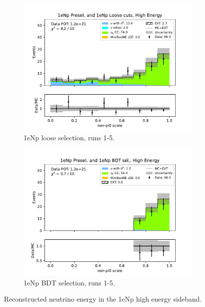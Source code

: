 \begin{figure}[H]
\begin{subfigure}{0.33\linewidth}
    \includegraphics[width=\linewidth]{technote/Sidebands/Figures/FarSideband/far_sideband_nonpi0_score_run1234a4b4c4d5_NP_NPL_HIGH_ENERGY.pdf}
    \caption{1eNp loose selection, runs 1-5.}
    \end{subfigure}%
    \begin{subfigure}{0.33\linewidth}
    \includegraphics[width=\linewidth]{technote/Sidebands/Figures/FarSideband/far_sideband_nonpi0_score_run1234a4b4c4d5_NP_NPBDT_HIGH_ENERGY.pdf}
    \caption{1eNp BDT selection, runs 1-5.}
    \end{subfigure}
    \caption{Reconstructed neutrino energy in the 1eNp high energy sideband.}
    \label{fig:HighEnergy1eNp_nonpi0_score}
\end{figure}

